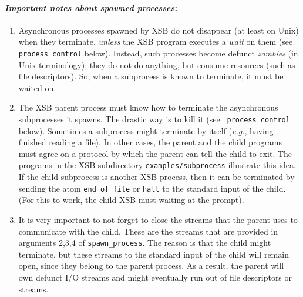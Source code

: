 \paragraph{{\em Important notes about spawned processes\/}:}
\begin{enumerate}
\item Asynchronous processes spawned by XSB do not disappear (at least on
  Unix) when they terminate, \emph{unless} the XSB program executes a
  \emph{wait} on them (see {\tt process\_control} below). Instead, such
  processes become defunct \emph{zombies} (in Unix terminology); they do
  not do anything, but consume resources (such as file descriptors). So,
  when a subprocess is known to terminate, it must be waited on.
  
\item The XSB parent process must know how to terminate the asynchronous
  subprocesses it spawns. The drastic way is to kill it (see {\tt
    process\_control} below). Sometimes a subprocess might terminate by
  itself ({\it e.g.}, having finished reading a file). In other cases, the
  parent and the child programs must agree on a protocol by which the
  parent can tell the child to exit. The programs in the XSB subdirectory
  {\tt examples/subprocess} illustrate this idea. If the child subprocess
  is another XSB process, then it can be terminated by sending the atom
  {\tt end\_of\_file} or {\tt halt} to the standard input of the child.
  (For this to work, the child XSB must waiting at the prompt).
\item It is very important to not forget to close the streams that the
  parent uses to communicate with the child. These are the streams
  that are provided in arguments 2,3,4 of {\tt spawn\_process}. The
  reason is that the child might terminate, but these streams to the
  standard input of the child will remain open, since they belong to
  the parent process. As a result, the parent will own defunct I/O
  streams and might eventually run out of file descriptors or streams.
\end{enumerate}

